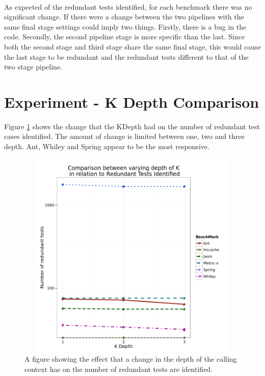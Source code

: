 \paragraph{}
As expected of the redundant tests identified, for each benchmark there was no significant change. If there were a change between the two pipelines with the same final stage settings could imply two things. Firstly, there is a bug in the code. Secondly, the second pipeline stage is more specific than the last. Since both the second stage and third stage share the same final stage, this would cause the last stage to be redundant and the redundant tests different to that of the two stage pipeline. 


\section{Experiment  - K Depth Comparison}
Figure \ref{fig:kdepthgraph} shows the change that the KDepth had on the number of redundant test cases identified. The amount of change is limited between one, two and three depth. Ant, Whiley and Spring appear to be the most responsive. 

\begin{figure}[h]
\begin{center}
\includegraphics[height=10cm, width = 14.5cm]{KDepth.png}
\end{center}
\caption{A figure showing the effect that a change in the depth of the calling context has on the number of redundant tests are identified.}
\label{fig:kdepthgraph}
\end{figure}

